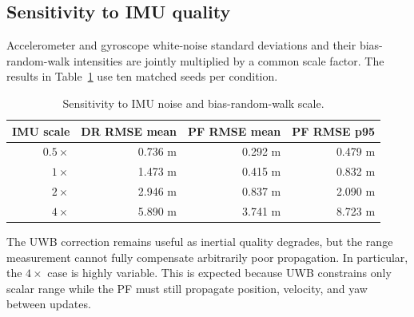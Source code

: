 \subsection{Sensitivity to IMU quality}
Accelerometer and gyroscope white-noise standard deviations and their bias-random-walk intensities are jointly multiplied by a common scale factor. The results in Table~\ref{tab:p1b_imu} use ten matched seeds per condition.
\begin{table}[ht]
\centering
\caption{Sensitivity to IMU noise and bias-random-walk scale.}
\label{tab:p1b_imu}
\begin{tabular}{rrrr}
\toprule
IMU scale & DR RMSE mean & PF RMSE mean & PF RMSE p95\\
\midrule
$0.5\times$ & 0.736 m & 0.292 m & 0.479 m\\
$1\times$ & 1.473 m & 0.415 m & 0.832 m\\
$2\times$ & 2.946 m & 0.837 m & 2.090 m\\
$4\times$ & 5.890 m & 3.741 m & 8.723 m\\
\bottomrule
\end{tabular}
\end{table}
The UWB correction remains useful as inertial quality degrades, but the range measurement cannot fully compensate arbitrarily poor propagation. In particular, the $4\times$ case is highly variable. This is expected because UWB constrains only scalar range while the PF must still propagate position, velocity, and yaw between updates.

